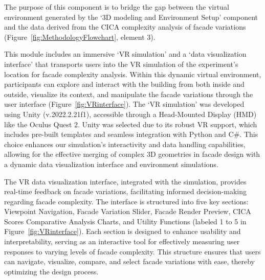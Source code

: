 

The purpose of this component is to bridge the gap between the virtual environment generated by the `3D modeling and Environment Setup' component and the data derived from the CICA complexity analysis of facade variations (Figure~\ref{fig:MethodologyFlowchart}, element 3).

This module includes an immersive `VR simulation' and a `data visualization interface' that transports users into the VR simulation of the experiment's location for facade complexity analysis.
Within this dynamic virtual environment, participants can explore and interact with the building from both inside and outside, visualize its context, and manipulate the facade variations through the user interface (Figure~\ref{fig:VRinterface}).
The `VR simulation' was developed using Unity (v.2022.2.21f1), accessible through a Head-Mounted Display (HMD) like the Oculus Quest 2.
Unity was selected due to its robust VR support, which includes pre-built templates and seamless integration with Python and C\#.
This choice enhances our simulation's interactivity and data handling capabilities, allowing for the effective merging of complex 3D geometries in facade design with a dynamic data visualization interface and environment simulations.

The VR data visualization interface, integrated with the simulation, provides real-time feedback on facade variations, facilitating informed decision-making regarding facade complexity.
The interface is structured into five key sections: Viewpoint Navigation, Facade Variation Slider, Facade Render Preview, CICA Scores Comparative Analysis Charts, and Utility Functions (labeled 1 to 5 in Figure~\ref{fig:VRinterface}). Each section is designed to enhance usability and interpretability, serving as an interactive tool for effectively measuring user responses to varying levels of facade complexity.
This structure ensures that users can navigate, visualize, compare, and select facade variations with ease, thereby optimizing the design process.


